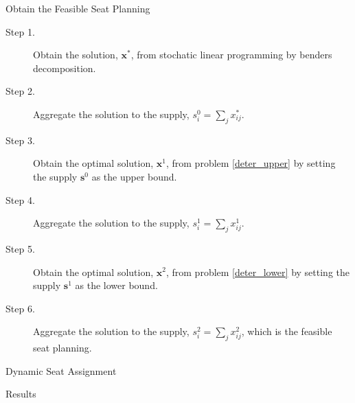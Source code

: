 \begin{frame}{Obtain the Feasible Seat Planning}
      \begin{description}
      \item[Step 1.] Obtain the solution, $\mathbf{x}^{*}$, from stochatic linear programming by benders decomposition.
  
      \item[Step 2.] Aggregate the solution to the supply, ${s}_{i}^{0} = \sum_{j} x^{*}_{ij}$.
  
      \item[Step 3.] Obtain the optimal solution, $\mathbf{x}^{1}$, from problem \eqref{deter_upper} by setting the supply $\mathbf{s}^{0}$ as the upper bound. 
      
      \item[Step 4.] Aggregate the solution to the supply, ${s}_{i}^{1} = \sum_{j} x^{1}_{ij}$.
  
      \item[Step 5.] Obtain the optimal solution, $\mathbf{x}^{2}$, from problem \eqref{deter_lower} by setting the supply $\mathbf{s}^{1}$ as the lower bound. 
      \item[Step 6.] Aggregate the solution to the supply, ${s}_{i}^{2} = \sum_{j} x^{2}_{ij}$, which is the feasible seat planning.
     \end{description}
\end{frame}

\begin{frame}{Dynamic Seat Assignment}
  
\end{frame}

\begin{frame}{Results}
    
\end{frame}